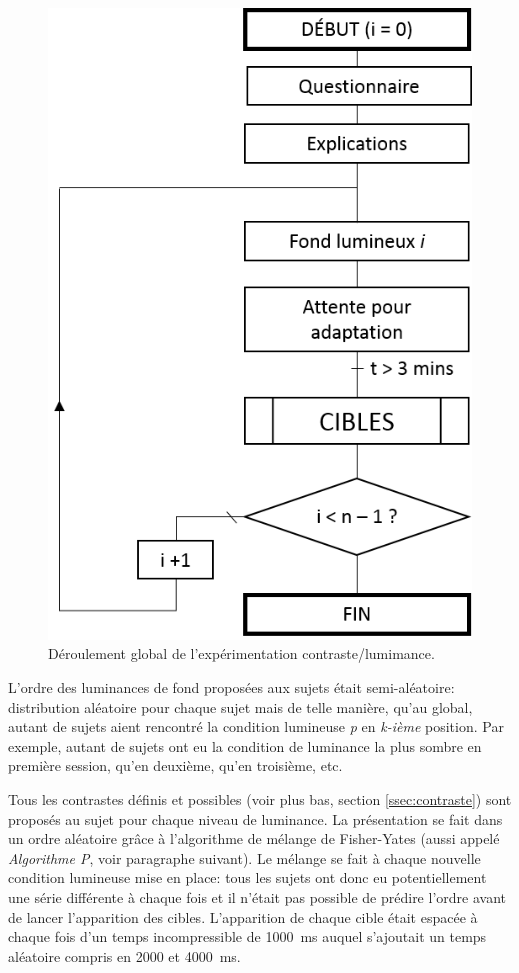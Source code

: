 	\begin{figure}
		\centering
		\includegraphics[scale=0.8]{Figures/FlowchartExpeRVPGeneral}
		\caption{Déroulement global de l'expérimentation contraste/lumimance.}
		\label{fig:flowchart_expe_general}
	\end{figure}
	
	\par L'ordre des luminances de fond proposées aux sujets était semi-aléatoire: distribution aléatoire pour chaque sujet mais de telle manière, qu'au global, autant de sujets aient rencontré la condition lumineuse \textit{p} en \textit{k-ième} position. Par exemple, autant de sujets ont eu la condition de luminance la plus sombre en première session, qu'en deuxième, qu'en troisième, etc.
	
	\par Tous les contrastes définis et possibles (voir plus bas, section \ref{ssec:contraste}) sont proposés au sujet pour chaque niveau de luminance. La présentation se fait dans un ordre aléatoire grâce à l'algorithme de mélange de Fisher-Yates (aussi appelé \textit{Algorithme P}, voir paragraphe suivant). Le mélange se fait à chaque nouvelle condition lumineuse mise en place: tous les sujets ont donc eu potentiellement une série différente à chaque fois et il n'était pas possible de prédire l'ordre avant de lancer l'apparition des cibles. L'apparition de chaque cible était espacée à chaque fois d'un temps incompressible de 1000~ms auquel s'ajoutait un temps aléatoire compris en 2000 et 4000~ms.
	
